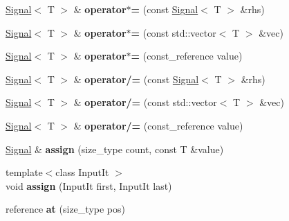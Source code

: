 \begin{DoxyCompactItemize}
\mbox{\hyperlink{classdsp_1_1_signal}{Signal}}$<$ T $>$ \& {\bfseries operator$\ast$=} (const \mbox{\hyperlink{classdsp_1_1_signal}{Signal}}$<$ T $>$ \&rhs)
\item 
\mbox{\label{classdsp_1_1_signal_a9ab1973cd4fbc45bad6165c5f9290f1e}} 
\mbox{\hyperlink{classdsp_1_1_signal}{Signal}}$<$ T $>$ \& {\bfseries operator$\ast$=} (const std\+::vector$<$ T $>$ \&vec)
\item 
\mbox{\label{classdsp_1_1_signal_a9335ebc0bde88f83578cc7b342e625dc}} 
\mbox{\hyperlink{classdsp_1_1_signal}{Signal}}$<$ T $>$ \& {\bfseries operator$\ast$=} (const\+\_\+reference value)
\item 
\mbox{\label{classdsp_1_1_signal_abe6520064bdf57f1c664385c717bedd7}} 
\mbox{\hyperlink{classdsp_1_1_signal}{Signal}}$<$ T $>$ \& {\bfseries operator/=} (const \mbox{\hyperlink{classdsp_1_1_signal}{Signal}}$<$ T $>$ \&rhs)
\item 
\mbox{\label{classdsp_1_1_signal_acda86a8298569e910326c3dc428a6161}} 
\mbox{\hyperlink{classdsp_1_1_signal}{Signal}}$<$ T $>$ \& {\bfseries operator/=} (const std\+::vector$<$ T $>$ \&vec)
\item 
\mbox{\label{classdsp_1_1_signal_a61ccbd29fa50d05edded19b2f9bdb86f}} 
\mbox{\hyperlink{classdsp_1_1_signal}{Signal}}$<$ T $>$ \& {\bfseries operator/=} (const\+\_\+reference value)
\item 
\mbox{\label{classdsp_1_1_signal_a0367da2380bae27c7ddcc31889441aa3}} 
\mbox{\hyperlink{classdsp_1_1_signal}{Signal}} \& {\bfseries assign} (size\+\_\+type count, const T \&value)
\item 
\mbox{\label{classdsp_1_1_signal_a52aced4a57bebc613ec0b135f9071a64}} 
{\footnotesize template$<$class Input\+It $>$ }\\void {\bfseries assign} (Input\+It first, Input\+It last)
\item 
\mbox{\label{classdsp_1_1_signal_a9419c2179e7e05f52e483d8b726da36c}} 
reference {\bfseries at} (size\+\_\+type pos)
\item 

\end{DoxyCompactItemize}
